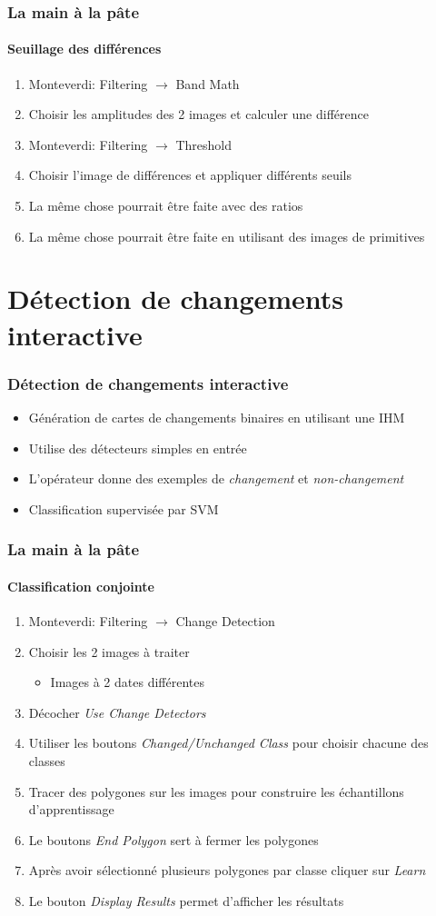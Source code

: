 \documentclass[compress]{beamer}
\begin{document}
\begin{frame}
  \frametitle{La main à la pâte}
  \framesubtitle{Seuillage des différences}
  \begin{enumerate}
  \item Monteverdi: Filtering $\rightarrow$ Band Math
  \item Choisir les amplitudes des 2 images et calculer une différence
  \item Monteverdi: Filtering $\rightarrow$ Threshold
  \item Choisir l'image de différences et appliquer différents seuils
  \item La même chose pourrait être faite avec des ratios
  \item La même chose pourrait être faite en utilisant des images de primitives
  \end{enumerate}
\end{frame}


\section[Application]{Détection de changements interactive}

\begin{frame}
  \frametitle{Détection de changements interactive}
  \begin{itemize}
    \item Génération de cartes de changements binaires en utilisant une
      IHM
    \item Utilise des détecteurs simples en entrée
    \item L'opérateur donne des exemples de {\em changement} et {\em non-changement}
    \item Classification supervisée par SVM
  \end{itemize}
\end{frame}


\begin{frame}
  \frametitle{La main à la pâte}
  \framesubtitle{Classification conjointe}
  \begin{enumerate}
  \item Monteverdi: Filtering $\rightarrow$ Change Detection
  \item Choisir les 2 images à traiter
    \begin{itemize}
    \item Images à 2 dates différentes
    \end{itemize}
  \item Décocher {\em Use Change Detectors}
  \item Utiliser les boutons {\em Changed/Unchanged Class} pour
    choisir chacune des classes
  \item Tracer des polygones sur les images pour construire les
    échantillons d'apprentissage
  \item Le boutons {\em End Polygon} sert à fermer les polygones
  \item Après avoir sélectionné plusieurs polygones par classe cliquer
    sur {\em Learn}
  \item Le bouton {\em Display Results} permet d'afficher les résultats
  \end{enumerate}
\end{frame}
\end{document}
